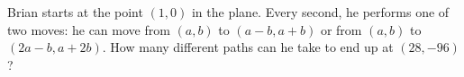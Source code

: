 Brian starts at the point $\left(1,0\right)$ in the plane. Every second, he performs one of two moves: he can move from $\left(a,b\right)$ to $\left(a-b,a+b\right)$ or from $\left(a,b\right)$ to $\left(2a-b,a+2b\right)$. How many different paths can he take to end up at $\left(28,-96\right)$?